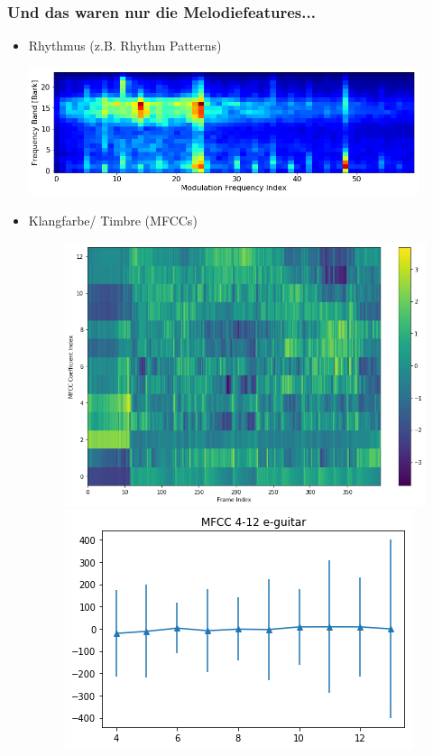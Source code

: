 \documentclass[12pt]{FSUBeamer_official}
\begin{document}
\begin{frame}
	\frametitle{Und das waren nur die Melodiefeatures...}
	\begin{itemize}
		\item Rhythmus (z.B. Rhythm Patterns)
		\begin{minipage}[b]{0.9\linewidth}
			\centering
			\includegraphics[width=0.9\textwidth]{pics/Beat/h_o_rp.png}
		\end{minipage}
		\item Klangfarbe/ Timbre (MFCCs)
		\begin{figure}[ht]
			\begin{minipage}[b]{0.375\linewidth}
				\centering
				\includegraphics[width=\textwidth]{pics/MFCC/mfcc_guitar.png}
			\end{minipage}
			\hspace{0.5cm}
			\begin{minipage}[b]{0.375\linewidth}
				\centering
				\includegraphics[width=\textwidth]{pics/MFCC/stat_eguitar.png}

\end{minipage}
\end{figure}
\end{itemize}
\end{frame}
\end{document}
